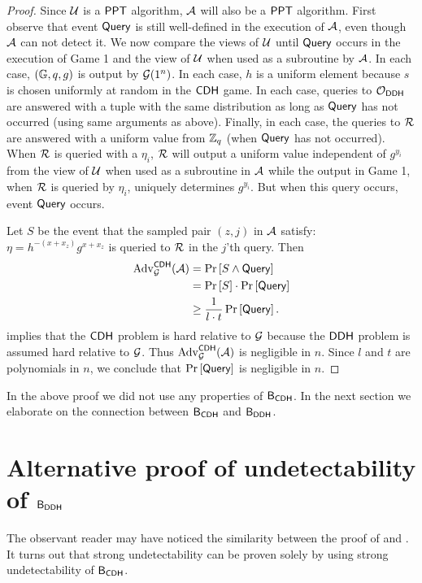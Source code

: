 \begin{proof}
Since $\mathcal{U}$ is a $\mathsf{PPT}$ algorithm, $\mathcal{A}$ will also be a $\mathsf{PPT}$ algorithm. First observe that event $\mathsf{Query}$ is still well-defined in the execution of $\mathcal{A}$, even though $\mathcal{A}$ can not detect it. We now compare the views of $\mathcal{U}$ until $\mathsf{Query}$ occurs in the execution of Game 1 and the view of $\mathcal{U}$ when used as a subroutine by $\mathcal{A}$. In each case, $(\mathbb{G},q,g)$ is output by $\operatorname{\mathcal{G}}(1^n)$. In each case, $h$ is a uniform element because $s$ is chosen uniformly at random in the $\mathsf{CDH}$ game. In each case, queries to $\operatorname{\mathcal{O}}_{\mathsf{DDH}}$ are answered with a tuple with the same distribution as long as $\mathsf{Query}$ has not occurred (using same arguments as above). Finally, in each case, the queries to $\operatorname{\mathcal{R}}$ are answered with a uniform value from $\mathbb{Z}_q$ (when $\mathsf{Query}$ has not occurred). When $\operatorname{\mathcal{R}}$ is queried with a $\eta_i$, $\operatorname{\mathcal{R}}$ will output a uniform value independent of $g^{y_i}$ from the view of $\mathcal{U}$ when used as a subroutine in $\mathcal{A}$ while the output in Game 1, when $\operatorname{\mathcal{R}}$ is queried by $\eta_i$, uniquely determines $g^{y_i}$. But when this query occurs, event $\mathsf{Query}$ occurs. 

Let $S$ be the event that the sampled pair $(z,j)$ in $\mathcal{A}$ satisfy: $\eta = h^{-(x+x_z)}g^{x+x_z}$ is queried to $\operatorname{\mathcal{R}}$ in the $j$'th query. Then
\begin{align*}
	\operatorname{Adv}_{\operatorname{\mathcal{G}}}^{\mathsf{CDH}}(\mathcal{A}) &= \operatorname{Pr}\left[{S\wedge \mathsf{Query}}\right] \\
	& = \operatorname{Pr}\left[{S}\right]\cdot\operatorname{Pr}\left[{\mathsf{Query}}\right] \\
	& \geq \frac{1}{l\cdot t}\operatorname{Pr}\left[{\mathsf{Query}}\right].
\end{align*}
 implies that the $\mathsf{CDH}$ problem is hard relative to $\operatorname{\mathcal{G}}$ because the $\mathsf{DDH}$ problem is assumed hard relative to $\operatorname{\mathcal{G}}$. Thus $\operatorname{Adv}_{\operatorname{\mathcal{G}}}^{\mathsf{CDH}}(\mathcal{A})$ is negligible in $n$. Since $l$ and $t$ are polynomials in $n$, we conclude that $\operatorname{Pr}\left[{\mathsf{Query}}\right]$ is negligible in $n$. 
\end{proof}

In the above proof we did not use any properties of $\mathsf{B}_{\mathsf{CDH}}$. In the next section we elaborate on the connection between $\mathsf{B}_{\mathsf{CDH}}$ and $\mathsf{B}_{\mathsf{DDH}}$. 

\section{Alternative proof of undetectability of $\mathsf{B}_{\mathsf{DDH}}$}

The observant reader may have noticed the similarity between the proof of  and . It turns out that strong undetectability can be proven solely by using strong undetectability of $\mathsf{B}_{\mathsf{CDH}}$. 

